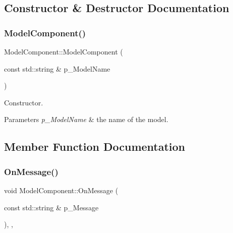 \subsection{Constructor \& Destructor Documentation}
\mbox{\label{class_model_component_a2697cdcdf32b12a0c0bd69bbec809eb1}} 
\subsubsection{\texorpdfstring{ModelComponent()}{ModelComponent()}}
{\footnotesize\ttfamily Model\+Component\+::\+Model\+Component (\begin{DoxyParamCaption}\item[{const std\+::string \&}]{p\+\_\+\+Model\+Name }\end{DoxyParamCaption})\hspace{0.3cm}{\ttfamily [inline]}}



Constructor. 


\begin{DoxyParams}{Parameters}
{\em p\+\_\+\+Model\+Name} & the name of the model. \\
\hline
\end{DoxyParams}


\subsection{Member Function Documentation}
\mbox{\label{class_model_component_aff7bfde1544e8e608e55680706321fac}} 
\subsubsection{\texorpdfstring{OnMessage()}{OnMessage()}}
{\footnotesize\ttfamily void Model\+Component\+::\+On\+Message (\begin{DoxyParamCaption}\item[{const std\+::string \&}]{p\+\_\+\+Message }\end{DoxyParamCaption})\hspace{0.3cm}{\ttfamily [inline]}, {\ttfamily [override]}, {\ttfamily [virtual]}}



